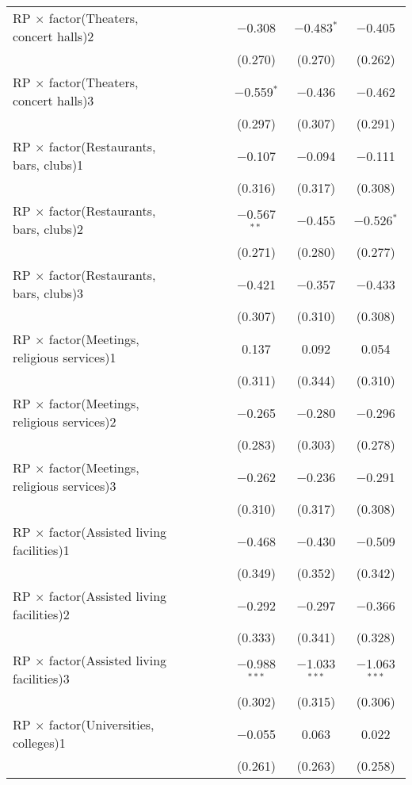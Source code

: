 \begin{table}[!htbp]
\begin{tabular}{@{\extracolsep{5pt}}lcccccc}
  RP $\times$ factor(Theaters, concert halls)2 &  &  &  & $-$0.308 & $-$0.483$^{*}$ & $-$0.405 \\ 
  &  &  &  & (0.270) & (0.270) & (0.262) \\ 
  RP $\times$ factor(Theaters, concert halls)3 &  &  &  & $-$0.559$^{*}$ & $-$0.436 & $-$0.462 \\ 
  &  &  &  & (0.297) & (0.307) & (0.291) \\ 
  RP $\times$ factor(Restaurants, bars, clubs)1 &  &  &  & $-$0.107 & $-$0.094 & $-$0.111 \\ 
  &  &  &  & (0.316) & (0.317) & (0.308) \\ 
  RP $\times$ factor(Restaurants, bars, clubs)2 &  &  &  & $-$0.567$^{**}$ & $-$0.455 & $-$0.526$^{*}$ \\ 
  &  &  &  & (0.271) & (0.280) & (0.277) \\ 
  RP $\times$ factor(Restaurants, bars, clubs)3 &  &  &  & $-$0.421 & $-$0.357 & $-$0.433 \\ 
  &  &  &  & (0.307) & (0.310) & (0.308) \\ 
  RP $\times$ factor(Meetings, religious services)1 &  &  &  & 0.137 & 0.092 & 0.054 \\ 
  &  &  &  & (0.311) & (0.344) & (0.310) \\ 
  RP $\times$ factor(Meetings, religious services)2 &  &  &  & $-$0.265 & $-$0.280 & $-$0.296 \\ 
  &  &  &  & (0.283) & (0.303) & (0.278) \\ 
  RP $\times$ factor(Meetings, religious services)3 &  &  &  & $-$0.262 & $-$0.236 & $-$0.291 \\ 
  &  &  &  & (0.310) & (0.317) & (0.308) \\ 
  RP $\times$ factor(Assisted living facilities)1 &  &  &  & $-$0.468 & $-$0.430 & $-$0.509 \\ 
  &  &  &  & (0.349) & (0.352) & (0.342) \\ 
  RP $\times$ factor(Assisted living facilities)2 &  &  &  & $-$0.292 & $-$0.297 & $-$0.366 \\ 
  &  &  &  & (0.333) & (0.341) & (0.328) \\ 
  RP $\times$ factor(Assisted living facilities)3 &  &  &  & $-$0.988$^{***}$ & $-$1.033$^{***}$ & $-$1.063$^{***}$ \\ 
  &  &  &  & (0.302) & (0.315) & (0.306) \\ 
  RP $\times$ factor(Universities, colleges)1 &  &  &  & $-$0.055 & 0.063 & 0.022 \\ 
  &  &  &  & (0.261) & (0.263) & (0.258) \\ 

\end{tabular}
\end{table}
